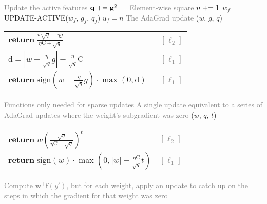 \begin{algorithm}
\begin{multicols}{2}
\begin{algorithmic}[]
            \State \textcolor{gray}{Update the active features}
            \State $\mathbf{q} \mathrel{+}= \mathbf{g}^2$\textcolor{white}{......}\textcolor{gray}{Element-wise square}
            \State $n \mathrel{+}= 1$
                \State $w_f =$ UPDATE-ACTIVE($w_f$, $g_f$, $q_f$)
                \State $u_f = n$
    \EndMyFor
    \EndMyFor
    \EndMyFor
    \columnbreak
    \State \textcolor{gray}{The AdaGrad update}
    ($w$, $g$, $q$) \\
        \hspace{4mm}\begin{tabular}{ll}
            $\mathbf{return} \; \frac{w \sqrt{q} - \eta g}{\eta \mathrm{C} + \sqrt{q}}$
            & \textcolor{gray}{$\;\;\,[\ell_2]$} \\
            $\mathrm{d} = |w - \frac{\eta}{\sqrt{q}} g| - \frac{\eta}{\sqrt{q}} \mathrm{C}$
            & \textcolor{gray}{$\;\;\,[\ell_1]$} \\
            $\mathbf{return} \; \mathrm{sign}(w - \frac{\eta}{\sqrt{q}} g) \cdot \max(0, \mathrm{d})$
            & \textcolor{gray}{$\;\;\,[\ell_1]$} \\
        \end{tabular}
    \EndMyFunction
    \vspace{1mm}
    \begin{lefttopbot}[style=mdftight]
    \vspace{-1mm}
    \State \textcolor{gray}{Functions only needed for sparse updates}
    \vspace{1mm}
    \State \textcolor{gray}{A single update equivalent to a series of AdaGrad updates where the weight's subgradient was zero}
    ($w$, $q$, $t$) \\
        \vspace{1mm}\hspace{4mm}\begin{tabular}{ll}
            $\mathbf{return} \; w \left(\frac{\sqrt{q}}{\eta \mathrm{C} + \sqrt{q}}\right)^{t}$
            & \textcolor{gray}{$[\ell_2]$} \\
            $\mathbf{return} \; \mathrm{sign}(w) \cdot \max(0, |w| - \frac{\eta \mathrm{C}}{\sqrt{q}} t)$
            & \textcolor{gray}{$[\ell_1]$} \\
        \end{tabular}
    \EndMyFunction
    \vspace{-1mm}
    \State \textcolor{gray}{Compute $\mathbf{w}^\top \mathbf{f}(y')$, but for each weight, apply an update to catch up on the steps in which the gradient for that weight was zero}

\end{lefttopbot}
\end{algorithmic}
\end{multicols}
\end{algorithm}
